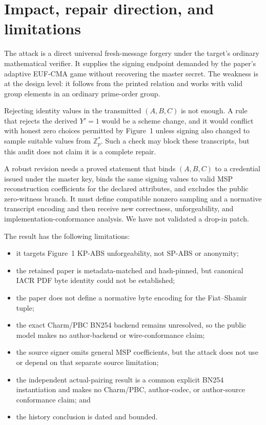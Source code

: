 \documentclass[10pt,a4paper]{article}
\newcommand{\Zp}{\mathbb{Z}_p}
\begin{document}
\section{Impact, repair direction, and limitations}

The attack is a direct universal fresh-message forgery under the target's
ordinary mathematical verifier. It supplies the signing endpoint demanded by
the paper's adaptive EUF-CMA game without recovering the master secret. The
weakness is at the design level: it follows from the printed relation and
works with valid group elements in an ordinary prime-order group.

Rejecting identity values in the transmitted $(A,B,C)$ is not enough. A rule
that rejects the derived $Y'=1$ would be a scheme change, and it would conflict
with honest zero choices permitted by Figure~1 unless signing also changed to
sample suitable values from $\Zp^*$. Such a check may block these transcripts,
but this audit does not claim it is a complete repair.

A robust revision needs a proved statement that binds $(A,B,C)$ to a
credential issued under the master key, binds the same signing values to valid
MSP reconstruction coefficients for the declared attributes, and excludes the
public zero-witness branch. It must define compatible nonzero sampling and a
normative transcript encoding and then receive new correctness,
unforgeability, and implementation-conformance analysis. We have not
validated a drop-in patch.

The result has the following limitations:
\begin{itemize}
  \item it targets Figure~1 KP-ABS unforgeability, not SP-ABS or anonymity;
  \item the retained paper is metadata-matched and hash-pinned, but canonical
        IACR PDF byte identity could not be established;
  \item the paper does not define a normative byte encoding for the
        Fiat--Shamir tuple;
  \item the exact Charm/PBC BN254 backend remains unresolved, so the public
        model makes no author-backend or wire-conformance claim;
  \item the source signer omits general MSP coefficients, but the attack does
        not use or depend on that separate source limitation;
  \item the independent actual-pairing result is a common explicit BN254
        instantiation and makes no Charm/PBC, author-codec, or author-source
        conformance claim; and
  \item the history conclusion is dated and bounded.
\end{itemize}
\end{document}
